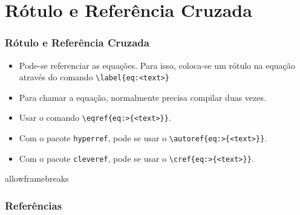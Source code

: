 \documentclass[brazilian]{beamer}
\begin{document}
\section{Rótulo e Referência Cruzada}
\begin{frame}[fragile]
    \frametitle{Rótulo e Referência Cruzada}

    \begin{itemize}
        \item Pode-se referenciar as equações. Para isso, coloca-se um rótulo na equação através do comando \lstinline[style=myStyleLatex]!\label{eq:<text>}!
        \item Para chamar a equação, normalmente precisa compilar duas vezes. 
        \item Usar o comando \lstinline[style=myStyleLatex]!\eqref{eq:>{<text>}}!. 
        \item Com o pacote \texttt{hyperref}, pode se usar o \lstinline[style=myStyleLatex]!\autoref{eq:>{<text>}}!.
        \item Com o pacote \texttt{cleveref}, pode se usar o \lstinline[style=myStyleLatex]!\cref{eq:>{<text>}}!.
    \end{itemize}

\end{frame}


\begin{frame}{allowframebreaks}
    \frametitle{Referências}
    \nocite{*}
    \printbibliography[keyword={inserirEquacoes}]
\end{frame}
\end{document}
